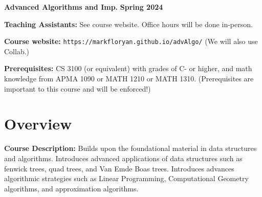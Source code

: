 \documentclass[12pt]{article}
\begin{document}
\textbf{\Large Advanced Algorithms and Imp.} \hfill \textbf{\Large Spring 2024}

\vskip 0.5in 


\vskip 0.1in
\textbf{Teaching Assistants:} See course website.  Office hours will be done in-person.

\vskip 0.1in
\textbf{Course website:} {\tt https://markfloryan.github.io/advAlgo/} (We will also use Collab.)

\textbf{Prerequisites:} CS 3100 (or equivalent) with grades of C- or higher, and math knowledge from APMA 1090 or MATH 1210 or MATH 1310. (Prerequisites are important to this course and will be enforced!)

\section*{Overview}

\textbf{Course Description:} Builds upon the foundational material in data structures and algorithms. Introduces advanced applications of data structures such as fenwick trees, quad trees, and Van Emde Boas trees. Introduces advances algorithmic strategies such as Linear Programming, Computational Geometry algorithms, and approximation algorithms.
\end{document}
